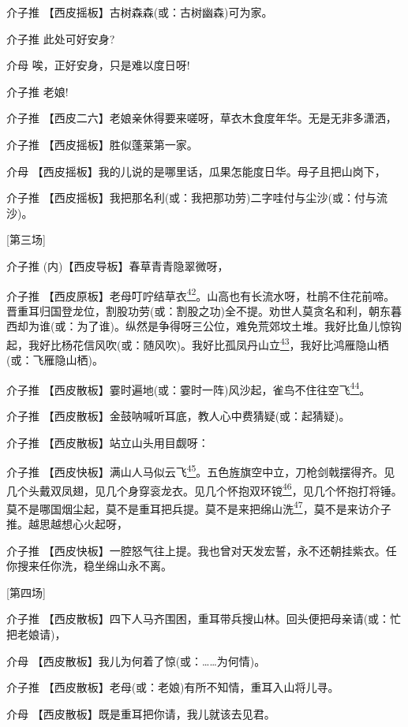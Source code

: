 介子推 【西皮摇板】古树森森(或：古树幽森)可为家。

介子推 此处可好安身?

介母 唉，正好安身，只是难以度日呀!

介子推 老娘!

介子推 【西皮二六】老娘亲休得要来嗟呀，草衣木食度年华。无是无非多潇洒，

介子推 【西皮摇板】胜似蓬莱第一家。

介母 【西皮摇板】我的儿说的是哪里话，瓜果怎能度日华。母子且把山岗下，

介子推
【西皮摇板】我把那名利(或：我把那功劳)二字哇付与尘沙(或：付与流沙)。

{[}第三场{]}

介子推 (内)【西皮导板】春草青青隐翠微呀，

介子推
【西皮原板】老母叮咛结草衣\protect\hyperlink{fn42}{\textsuperscript{42}}。山高也有长流水呀，杜鹃不住花前啼。晋重耳归国登龙位，割股功劳(或：割股之功)全不提。劝世人莫贪名和利，朝东暮西却为谁(或：为了谁)。纵然是争得呀三公位，难免荒郊坟土堆。我好比鱼儿惊钩起，我好比杨花信风吹(或：随风吹)。我好比孤凤丹山立\protect\hyperlink{fn43}{\textsuperscript{43}}，我好比鸿雁隐山栖(或：飞雁隐山栖)。

介子推
【西皮散板】霎时遍地(或：霎时一阵)风沙起，雀鸟不住往空飞\protect\hyperlink{fn44}{\textsuperscript{44}}。

介子推 【西皮散板】金鼓呐喊听耳底，教人心中费猜疑(或：起猜疑)。

介子推 【西皮散板】站立山头用目觑呀：

介子推
【西皮快板】满山人马似云飞\protect\hyperlink{fn45}{\textsuperscript{45}}。五色旌旗空中立，刀枪剑戟摆得齐。见几个头戴双凤翅，见几个身穿衮龙衣。见几个怀抱双环镋\protect\hyperlink{fn46}{\textsuperscript{46}}，见几个怀抱打将锤。莫不是哪国烟尘起，莫不是重耳把兵提。莫不是来把绵山洗\protect\hyperlink{fn47}{\textsuperscript{47}}，莫不是来访介子推。越思越想心火起呀，

介子推
【西皮快板】一腔怒气往上提。我也曾对天发宏誓，永不还朝挂紫衣。任你搜来任你洗，稳坐绵山永不离。

{[}第四场{]}

介子推
【西皮散板】四下人马齐围困，重耳带兵搜山林。回头便把母亲请(或：忙把老娘请)，

介母 【西皮散板】我儿为何着了惊(或：\ldots{}\ldots{}为何情)。

介子推 【西皮散板】老母(或：老娘)有所不知情，重耳入山将儿寻。

介母 【西皮散板】既是重耳把你请，我儿就该去见君。

